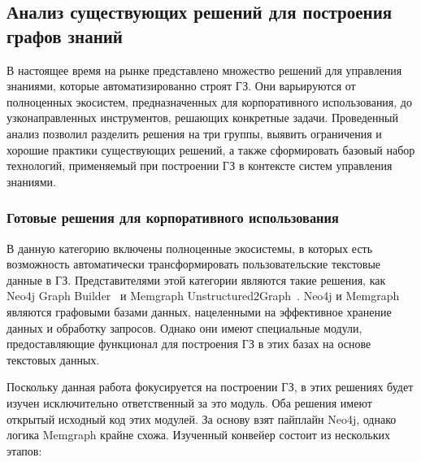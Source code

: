\subsection{Анализ существующих решений для построения графов знаний}

В настоящее время на рынке представлено множество решений
для управления знаниями, которые автоматизированно строят ГЗ.
Они варьируются от полноценных экосистем, предназначенных для корпоративного использования,
до узконаправленных инструментов, решающих конкретные задачи.
Проведенный анализ позволил разделить решения на три группы, выявить ограничения и хорошие практики
существующих решений, а также сформировать базовый набор технологий,
применяемый при построении ГЗ в контексте систем управления знаниями.

\subsubsection*{Готовые решения для корпоративного использования}
В данную категорию включены полноценные экосистемы,
в которых есть возможность
автоматически трансформировать пользовательские текстовые данные
в ГЗ.
Представителями этой категории являются такие решения, как
Neo4j Graph Builder~\cite{neo4j_graph_builder} и Memgraph Unstructured2Graph~\cite{memgraph_u2g}.
Neo4j и Memgraph являются графовыми базами данных,
нацеленными на эффективное хранение данных
и обработку запросов.
Однако они имеют специальные модули, предоставляющие
функционал для построения ГЗ в этих базах
на основе текстовых данных.

Поскольку данная работа фокусируется на построении ГЗ,
в этих решениях будет изучен исключительно ответственный за это модуль.
Оба решения имеют открытый исходный код этих модулей.
За основу взят пайплайн Neo4j, однако логика Memgraph крайне схожа.
Изученный конвейер состоит из нескольких этапов:

